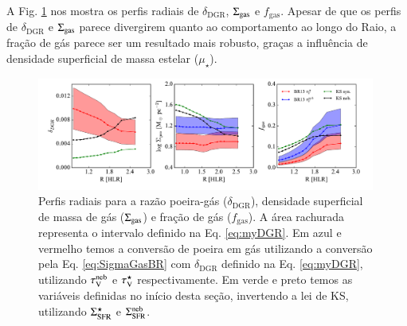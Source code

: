A Fig. \ref{fig:propsGasR} nos mostra os perfis radiais de $\delta_{\mathrm{DGR}}$, $\SigmaGas$ e
$f_{\mathrm{gas}}$. Apesar de que os perfis de $\delta_{\mathrm{DGR}}$ e $\SigmaGas$ parece
divergirem quanto ao comportamento ao longo do Raio, a fração de gás parece ser um resultado mais
robusto, graças a influência de densidade superficial de massa estelar ($\mu_\star$).
\begin{figure}
	\centering
	\includegraphics[width=0.99\textwidth]{figuras/gas_R.pdf}
	\caption[Perfis radiais de $\delta_{\mathrm{DGR}}$, $\SigmaGas$ e $f_{\mathrm{gas}}$.]
	{Perfis radiais para a razão poeira-gás ($\delta_{\mathrm{DGR}}$), densidade superficial de massa
de gás ($\SigmaGas$) e fração de gás ($f_{\mathrm{gas}}$). A área rachurada representa o intervalo
definido na Eq. \ref{eq:myDGR}. Em azul e vermelho temos a conversão de poeira em gás utilizando a
conversão pela Eq. \ref{eq:SigmaGasBR} com $\delta_{\mathrm{DGR}}$ definido na Eq. \ref{eq:myDGR},
utilizando $\tau_{\mathrm{V}}^{\mathrm{neb}}$ e $\tau_{\mathrm{V}}^\star$ respectivamente. Em verde e preto temos as variáveis definidas no
início desta seção, invertendo a lei de KS, utilizando $\Sigma_{\mathrm{SFR}}^\star$ e $\Sigma_{\mathrm{SFR}}^{\mathrm{neb}}$.}
	\label{fig:propsGasR}
\end{figure}

